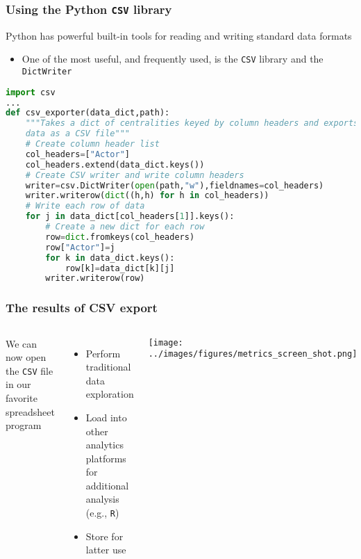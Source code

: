 \documentclass[xcolor=dvipsnames, 9pt]{beamer}
\begin{document}
\begin{frame}[fragile]
    \frametitle{Using the Python \texttt{CSV} library}
    Python has powerful built-in tools for reading and writing standard data formats
    \begin{itemize}
        \item One of the most useful, and frequently used, is the \texttt{CSV} library and the \texttt{DictWriter}
    \end{itemize}
    \begin{block}{}
        \scriptsize{\begin{lstlisting}[language=Python]
import csv
...
def csv_exporter(data_dict,path):
    """Takes a dict of centralities keyed by column headers and exports 
    data as a CSV file"""
    # Create column header list
    col_headers=["Actor"]
    col_headers.extend(data_dict.keys())
    # Create CSV writer and write column headers
    writer=csv.DictWriter(open(path,"w"),fieldnames=col_headers)
    writer.writerow(dict((h,h) for h in col_headers))
    # Write each row of data
    for j in data_dict[col_headers[1]].keys():
        # Create a new dict for each row
        row=dict.fromkeys(col_headers)
        row["Actor"]=j
        for k in data_dict.keys():
            row[k]=data_dict[k][j]
        writer.writerow(row)
        \end{lstlisting}}
    \end{block}
\end{frame}

\begin{frame}[fragile]
    \frametitle{The results of CSV export}
    \begin{columns}
        We can now open the \texttt{CSV} file in our favorite spreadsheet program
        \begin{itemize}
            \item Perform traditional data exploration
            \item Load into other analytics platforms for additional analysis (e.g., \texttt{R})
            \item Store for latter use
        \end{itemize}
        \texttt{[image: ../images/figures/metrics\_screen\_shot.png]}
    \end{columns}
\end{frame}

\end{document}
